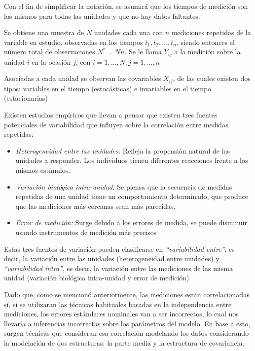 \documentclass[12pt]{article}
\begin{document}
Con el fin de simplificar la notación, se asumirá que los tiempos de medición son los mismos para todas las unidades y
que no hay datos faltantes.

Se obtiene una muestra de $N$ unidades cada una con $n$ mediciones repetidas de la variable en estudio, observadas en los
tiempos $t_1, t_2, ..., t_n$, siendo entonces el número total de observaciones $N^*=Nn$. Se le llama $Y_{ij}$ a la
medición sobre la unidad $i$ en la ocasión $j$, con $i=1, ..., N; j=1, ..., n$

Asociadas a cada unidad se observan las covariables $X_{ij}$, de las cuales existen dos tipos: variables en el tiempo
(estocásticas) e invariables en el tiempo (estacionarias)

Existen estudios empíricos que llevan a pensar que existen tres fuentes potenciales de variabilidad que influyen
sobre la correlación entre medidas repetidas:

\begin{itemize}
	\item \emph{Heterogeneidad entre las unidades:} Refleja la propensión natural de las unidades a responder.
	Los individuos tienen diferentes reacciones frente a los mismos estímulos.
	\item \emph{Variación biológica intra-unidad:} Se piensa que la secuencia de medidas repetidas de una unidad tiene
	un comportamiento determinado, que produce que las mediciones más cercanas sean más parecidas.
	\item \emph{Error de medición:} Surge debido a los errores de medida, se puede disminuir usando instrumentos
	de medición más precisos
\end{itemize}

Estas tres fuentes de variación pueden clasificarse en \emph{``variabilidad entre''}, es decir, la variación entre
las unidades (heterogeneidad entre unidades) y \emph{``variabilidad intra''}, es decir, la variación entre las mediciones
de las misma unidad (variación biológica intra-unidad y error de medición)

Dado que, como se mencionó anteriormente, las mediciones están correlacionadas sí, si se utilizaran las técnicas habituales
basadas en la independencia entre mediciones, los errores estándares nominales van a ser incorrectos, lo cual nos llevaría
a inferencias incorrectas sobre los parámetros del modelo. En base a esto, surgen técnicas que consideran esa correlación
modelando los datos considerando la modelación de dos estructuras: la parte media y la estructura de covariancia.
\end{document}
